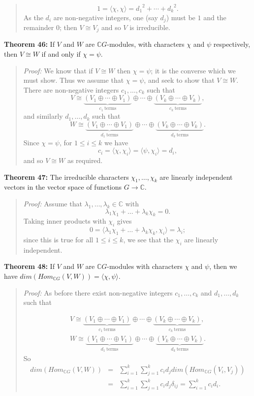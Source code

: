 {\begin{quote}
$$1=\langle\chi,\chi\rangle={d_1}^2+\cdots+{d_k}^2.$$
As the $d_i$ are non-negative integers, one (say $d_j$) must be $1$ and the
remainder $0$; then $V\cong V_j$ and so $V$ is irreducible.
\end{quote}
{\bf Theorem 46:} If $V$ and $W$ are ${\mathbb C}G$-modules, with
characters $\chi$ and $\psi$ respectively, then $V\cong W$ if and only if
$\chi=\psi$.
\begin{quote}
\emph{Proof:}
We know that if $V\cong W$ then
$\chi=\psi$; it is the converse which we must show. Thus we assume that
$\chi=\psi$, and seek to show that $V\cong W$. There are non-negative integers
$c_1,\dots,c_k$ such that
$$V\cong\underbrace{(V_1\oplus\cdots\oplus V_1)}_{c_1\ \mathrm{terms}}\oplus
\cdots\oplus\underbrace{(V_k\oplus\cdots\oplus V_k)}_{c_k\ \mathrm{terms}},$$
and similarly $d_1,\dots,d_k$ such that
$$W\cong\underbrace{(V_1\oplus\cdots\oplus V_1)}_{d_1\ \mathrm{terms}}\oplus
\cdots\oplus\underbrace{(V_k\oplus\cdots\oplus V_k)}_{d_k\ \mathrm{terms}}.$$
Since $\chi=\psi$, for $1\leq i\leq k$ we have
$$c_i=\langle\chi,\chi_i\rangle=\langle\psi,\chi_i\rangle=d_i,$$
and so $V\cong W$ as required.
\end{quote}
{\bf Theorem 47:} The irreducible characters
$\chi_1,\dots,\chi_k$ are linearly independent vectors in the vector
space of functions $G\rightarrow{\mathbb C}$.
\begin{quote}
\emph{Proof:}
Assume that $\lambda_1,\dots,\lambda_k\in{\mathbb C}$ with
$$\lambda_1\chi_1+\dots+\lambda_k\chi_k=0.$$
Taking inner products with $\chi_i$ gives
$$0=\langle\lambda_1\chi_1+\dots+\lambda_k\chi_k,\chi_i\rangle=\lambda_i;$$
since this is true for all $1\leq i\leq k$, we see that the $\chi_i$ are
linearly independent.
\end{quote}
{\bf Theorem 48:} If $V$ and $W$ are ${\mathbb C}G$-modules with characters
$\chi$ and $\psi$, then we have
$dim( Hom_{{\mathbb C}G}(V,W))=\langle\chi,\psi\rangle$.
\begin{quote}
\emph{Proof:}
As before there exist non-negative integers $c_1,\dots,c_k$ and
$d_1,\dots,d_k$ such that

\begin{eqnarray*}
&V\cong\underbrace{(V_1\oplus\cdots\oplus V_1)}_{c_1\ \mathrm{terms}}
\oplus\cdots\oplus
\underbrace{(V_k\oplus\cdots\oplus V_k)}_{c_k\ \mathrm{terms}},&\\
&W\cong\underbrace{(V_1\oplus\cdots\oplus V_1)}_{d_1\ \mathrm{terms}}
\oplus\cdots\oplus
\underbrace{(V_k\oplus\cdots\oplus V_k)}_{d_k\ \mathrm{terms}}.&
\end{eqnarray*}
So
\begin{eqnarray*}
dim( Hom_{{\mathbb C}G}(V,W))
\!\!\!\!&=&\!\!\!\!\sum_{i=1}^k\sum_{j=1}^kc_id_j dim( Hom_{{\mathbb C}G}(V_i,V_j))\\
\!\!\!\!&=&\!\!\!\!\sum_{i=1}^k\sum_{j=1}^kc_id_j\delta_{ij}
=\sum_{i=1}^kc_id_i.
\end{eqnarray*}


\end{quote}}
